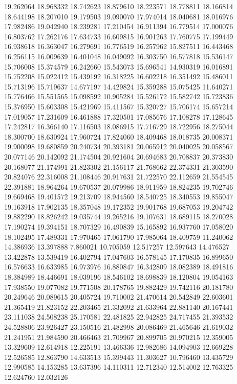 19.262064
18.968332
18.742623
18.879610
18.223571
18.778811
18.166814
18.644198
18.207010
19.179503
19.090070
17.974014
18.040681
18.016976
17.982486
19.042940
18.239281
17.210454
16.911394
16.779514
17.000076
16.803762
17.262176
17.634733
16.609815
16.901263
17.760775
17.199449
16.938618
16.363047
16.279691
16.776519
16.257962
15.827511
16.443468
16.256115
16.009639
16.401048
16.049092
16.303750
16.577818
15.536147
15.706008
15.374579
16.242660
15.543073
15.696541
14.930319
16.016891
15.752208
15.022412
15.439192
16.318225
16.602218
16.351492
15.486011
15.713196
15.719637
14.677197
14.429824
15.359288
15.075425
11.640271
15.776466
15.551565
15.098592
10.905284
15.526172
15.582742
15.723836
15.376950
15.603308
15.421969
15.411567
15.320727
15.706174
15.657214
17.019057
17.231609
16.461888
17.320501
17.085676
17.108278
17.128645
17.242817
16.366140
17.116503
18.086915
17.716729
18.722956
18.275044
18.300700
18.630924
17.960724
17.824060
18.409468
18.018735
20.008371
19.900098
19.680859
20.240734
20.393181
20.065912
20.040025
20.058567
20.077146
20.142092
21.174504
20.921604
20.694683
20.708837
20.373830
20.168077
21.174991
21.823302
21.156117
21.768662
22.374331
21.303590
20.824076
22.316008
21.108446
20.917631
21.722570
22.112659
21.554545
22.391881
18.964264
19.670537
20.079986
18.911959
18.824235
19.702746
19.669468
19.401572
19.213709
18.944560
18.540725
18.340553
19.855047
19.163918
17.902135
18.357048
19.172352
19.901768
19.687053
19.204742
19.882290
18.826242
19.035744
19.265216
19.107631
18.689115
18.270028
17.190274
19.394151
18.707329
16.490839
15.165892
16.937760
17.058020
18.102495
17.489331
17.970465
17.061790
17.985064
18.409759
11.240062
14.386936
13.397888
7.860021
10.705059
12.517257
12.597643
14.476527
13.422878
13.539419
16.402794
17.047603
16.578145
17.170835
16.899650
16.576633
16.633985
16.973976
16.880847
16.342809
18.082389
18.491816
18.384989
18.446691
18.039196
18.546102
18.698839
18.120804
19.054163
17.938550
19.077082
19.771508
20.178765
19.882429
19.742116
20.181780
20.249646
20.089615
20.405724
19.710002
21.470614
20.542849
22.603601
21.365419
21.823152
22.203465
21.332092
21.633964
22.881140
20.167441
23.111038
24.508238
25.170581
22.481825
22.942825
24.717455
21.393532
24.528806
23.926427
23.150516
21.482998
20.086469
21.465646
21.619032
21.241951
21.984590
20.466463
21.709967
20.899705
20.970215
12.359005
13.329609
12.614918
12.225191
13.466336
12.982686
14.094903
12.669228
12.526585
12.863790
14.633513
15.399443
11.303627
10.796460
13.435729
12.990585
14.153285
13.637396
14.110311
12.712340
12.514002
12.763325
12.624760
12.032126
